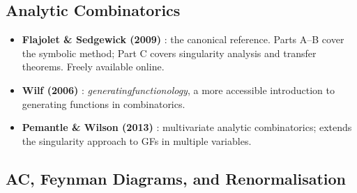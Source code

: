 \documentclass[11pt,a4paper]{article}
\theoremstyle{definition}
\begin{document}
\subsection{Analytic Combinatorics}

\begin{itemize}[leftmargin=2em]
  \item \textbf{Flajolet \& Sedgewick (2009)} \cite{flajolet2009}: the canonical
        reference. Parts A--B cover the symbolic method; Part C covers singularity
        analysis and transfer theorems. Freely available online.

  \item \textbf{Wilf (2006)} \cite{wilf2006}: \emph{generatingfunctionology}, a
        more accessible introduction to generating functions in combinatorics.

  \item \textbf{Pemantle \& Wilson (2013)} \cite{pemantle2013}: multivariate
        analytic combinatorics; extends the singularity approach to GFs in multiple
        variables.
\end{itemize}

\subsection{AC, Feynman Diagrams, and Renormalisation}
\end{document}
